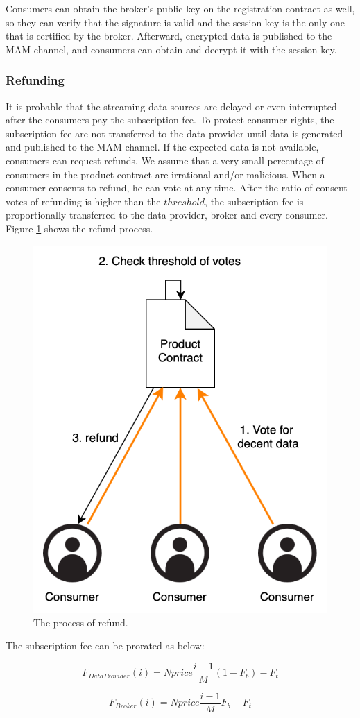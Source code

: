 \documentclass[journal,article,applsci,submit,moreauthors,pdftex]{Definitions/mdpi}
\begin{document}
Consumers can obtain the broker's public key on the registration contract as well, so they can verify that the signature is valid and the session key is the only one that is certified by the broker. Afterward, encrypted data is published to the MAM channel, and consumers can obtain and decrypt it with the session key.

\subsubsection{Refunding}

It is probable that the streaming data sources are delayed or even interrupted after the consumers pay the subscription fee. To protect consumer rights, the subscription fee are not transferred to the data provider until data is generated and published to the MAM channel. If the expected data is not available, consumers can request refunds. We assume that a very small percentage of consumers in the product contract are irrational and/or malicious. When a consumer consents to refund, he can vote at any time. After the ratio of consent votes of refunding is higher than the $threshold$, the subscription fee is proportionally transferred to the data provider, broker and every consumer. Figure \ref{fig:refund} shows the refund process.

\begin{figure}[h]
	\centering
	\includegraphics[width=2 in]{refund}
	\caption{The process of refund.}
	\label{fig:refund}
\end{figure}

The subscription fee can be prorated as below:

\begin{equation}
    F_{DataProvider}(i) = N price \frac{i-1}{M} (1-F_{b}) -F_{t}
\end{equation}

\begin{equation}
    F_{Broker}(i) = N price \frac{i-1}{M} F_{b} -F_{t}
\end{equation}
\end{document}
